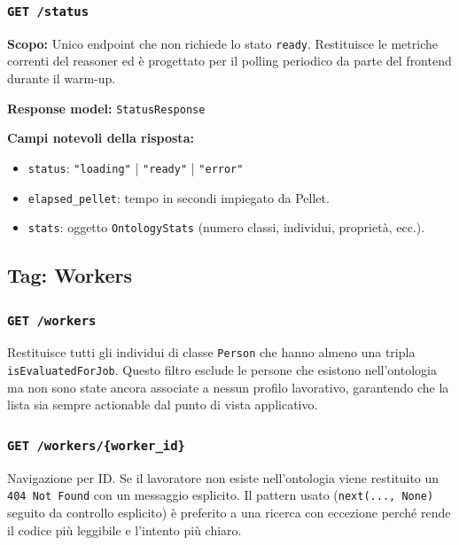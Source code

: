 \documentclass[a4paper,12pt]{article}
\begin{document}
\subsubsection{\texttt{GET /status}}

\textbf{Scopo:} Unico endpoint che non richiede lo stato \texttt{ready}.
Restituisce le metriche correnti del reasoner ed \`{e} progettato per il
polling periodico da parte del frontend durante il warm-up.

\textbf{Response model:} \texttt{StatusResponse}

\textbf{Campi notevoli della risposta:}
\begin{itemize}[noitemsep]
  \item \texttt{status}: \texttt{"loading"} | \texttt{"ready"} | \texttt{"error"}
  \item \texttt{elapsed\_pellet}: tempo in secondi impiegato da Pellet.
  \item \texttt{stats}: oggetto \texttt{OntologyStats} (numero classi,
        individui, propriet\`{a}, ecc.).
\end{itemize}

\subsection{Tag: Workers}

\subsubsection{\texttt{GET /workers}}

Restituisce tutti gli individui di classe \texttt{Person} che hanno
almeno una tripla \texttt{isEvaluatedForJob}. Questo filtro esclude le
persone che esistono nell'ontologia ma non sono state ancora associate
a nessun profilo lavorativo, garantendo che la lista sia sempre
actionable dal punto di vista applicativo.

\subsubsection{\texttt{GET /workers/\{worker\_id\}}}

Navigazione per ID. Se il lavoratore non esiste nell'ontologia viene
restituito un \texttt{404 Not Found} con un messaggio esplicito.
Il pattern usato (\texttt{next(..., None)} seguito da controllo esplicito)
\`{e} preferito a una ricerca con eccezione perch\'{e} rende il codice pi\`{u}
leggibile e l'intento pi\`{u} chiaro.
\end{document}
